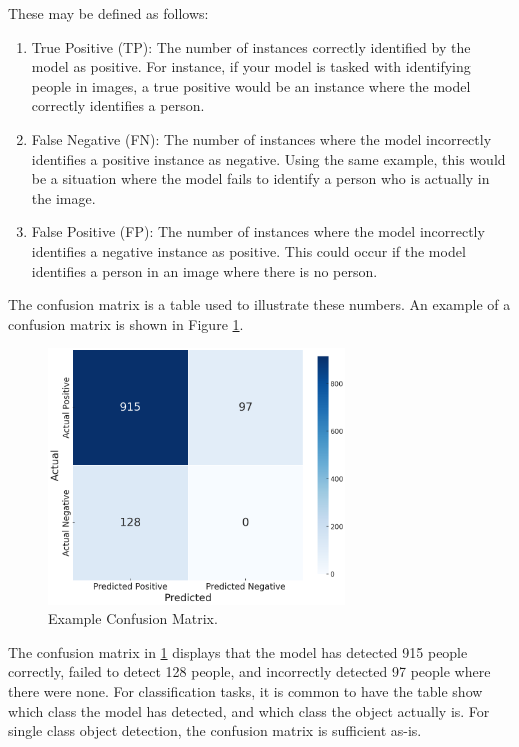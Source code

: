 These may be defined as follows:
\begin{enumerate}
    \item True Positive (TP): The number of instances correctly identified by the model as positive. For instance, if your model is tasked with identifying people in images, a true positive would be an instance where the model correctly identifies a person.
    \item False Negative (FN): The number of instances where the model incorrectly identifies a positive instance as negative. Using the same example, this would be a situation where the model fails to identify a person who is actually in the image.
    \item False Positive (FP): The number of instances where the model incorrectly identifies a negative instance as positive. This could occur if the model identifies a person in an image where there is no person.
\end{enumerate}

The confusion matrix is a table used to illustrate these numbers. An example of a confusion matrix is shown in Figure \ref{fig:confusion_matrix}.

\begin{figure}[H]
    \centering
    \includegraphics[width=0.7\textwidth]{Images/Diagrams/confusion_matrix.png}
    \caption{\centering Example Confusion Matrix.}
    \label{fig:confusion_matrix}
\end{figure}

The confusion matrix in \ref{fig:confusion_matrix} displays that the model has detected 915 people correctly, failed to detect 128 people, and incorrectly detected 97 people where there were none. For classification tasks, it is common to have the table show which class the model has detected, and which class the object actually is. For single class object detection, the confusion matrix is sufficient as-is.

